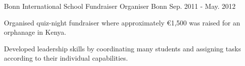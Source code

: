 \begin{cventries}
  \cventry
    {Bonn International School} %
    {Fundraiser Organiser} %
    {Bonn} %
    {Sep. 2011 - May. 2012} %
    {
      \begin{cvitems} %
        \item {Organised quiz-night fundraiser where approximately €1,500 was raised for an orphanage in Kenya.}
        \item {Developed leadership skills by coordinating many students and assigning tasks according to their individual capabilities.}
      \end{cvitems}
    }

\end{cventries}
